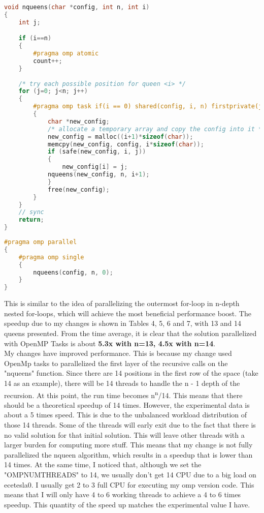 \documentclass[12pt]{article}
\begin{document}
 \begin{lstlisting}[language=c]
void nqueens(char *config, int n, int i)
{
    int j;

    if (i==n)
    {
        #pragma omp atomic
        count++;
    }
    
    /* try each possible position for queen <i> */
    for (j=0; j<n; j++)
    {
        #pragma omp task if(i == 0) shared(config, i, n) firstprivate(j)
        {   
            char *new_config;
            /* allocate a temporary array and copy the config into it */
            new_config = malloc((i+1)*sizeof(char));
            memcpy(new_config, config, i*sizeof(char));
            if (safe(new_config, i, j))
            {
                new_config[i] = j;
            nqueens(new_config, n, i+1);
            }
            free(new_config);
        }
    }
    // sync
    return;
}
 \end{lstlisting}
 
 \newpage
 \begin{lstlisting}[language=c, caption=Q2 Code Changes]
#pragma omp parallel
{
    #pragma omp single
    {
        nqueens(config, n, 0);
    }
}
 \end{lstlisting}
 
 \noindent
 This is similar to the idea of parallelizing the outermost for-loop in n-depth nested for-loops, which will achieve the most beneficial performance boost. The speedup due to my changes is shown in Tables 4, 5, 6 and 7, with 13 and 14 queens presented. From the time average, it is clear that the solution parallelized with OpenMP Tasks is about \textbf{5.3x with n=13, 4.5x with n=14}.  \\
 
 \indent
My changes have improved performance. This is because my change used OpenMp tasks to parallelized the first layer of the recursive calls on the "nqueens" function. Since there are 14 positions in the first row of the space (take 14 as an example), there will be 14 threads to handle the n - 1 depth of the recursion. At this point, the run time becomes n\textsuperscript{n}/14. This means that there should be a theoretical speedup of 14 times. However, the experimental data is about a 5 times speed. This is due to the unbalanced workload distribution of those 14 threads.  Some of the threads will early exit due to the fact that there is no valid solution for that initial solution. This will leave other threads with a larger burden for computing more stuff. This means that my change is not fully parallelized the nqueen algorithm, which results in a speedup that is lower than 14 times. At the same time, I noticed that, although we set the "OMPNUMTHREADS" to 14, we usually don't get 14 CPU due to a big load on ecetesla0. I usually get 2 to 3 full CPU for executing my omp version code. This means that I will only have 4 to 6 working threads to achieve a 4 to 6 times speedup. This quantity of the speed up matches the experimental value I have. \\
\end{document}
